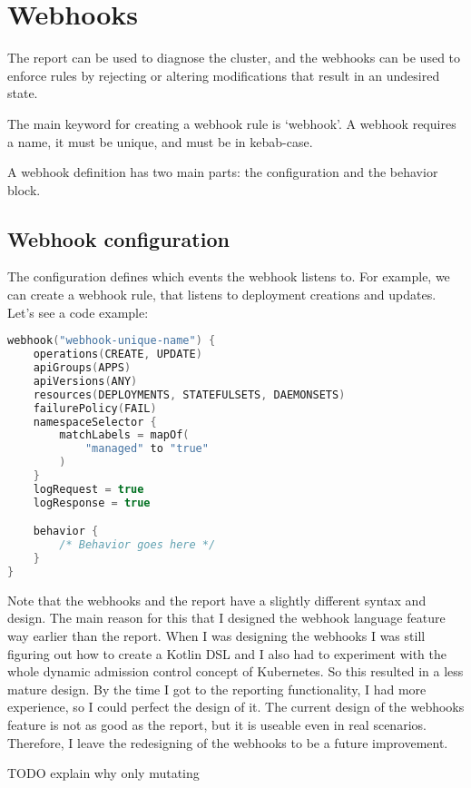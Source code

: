 \section{Webhooks}

The report can be used to diagnose the cluster, and the webhooks can be used to enforce rules by rejecting or altering modifications that result in an undesired state.

The main keyword for creating a webhook rule is `webhook'. A webhook requires a name, it must be unique, and must be in kebab-case.

A webhook definition has two main parts: the configuration and the behavior block.

\subsection{Webhook configuration}

The configuration defines which events the webhook listens to. For example, we can create a webhook rule, that listens to deployment creations and updates. Let's see a code example:

\begin{lstlisting}[caption={Webhook configuration},language=Kotlin,label=code:wh_conf]
webhook("webhook-unique-name") {
    operations(CREATE, UPDATE)
    apiGroups(APPS)
    apiVersions(ANY)
    resources(DEPLOYMENTS, STATEFULSETS, DAEMONSETS)
    failurePolicy(FAIL)
    namespaceSelector {
        matchLabels = mapOf(
            "managed" to "true"
        )
    }
    logRequest = true
    logResponse = true

    behavior {
        /* Behavior goes here */
    }
}
\end{lstlisting}

Note that the webhooks and the report have a slightly different syntax and design. The main reason for this that I designed the webhook language feature way earlier than the report. When I was designing the webhooks I was still figuring out how to create a Kotlin DSL and I also had to experiment with the whole dynamic admission control concept of Kubernetes. So this resulted in a less mature design. By the time I got to the reporting functionality, I had more experience, so I could perfect the design of it. The current design of the webhooks feature is not as good as the report, but it is useable even in real scenarios. Therefore, I leave the redesigning of the webhooks to be a future improvement.

TODO explain why only mutating

